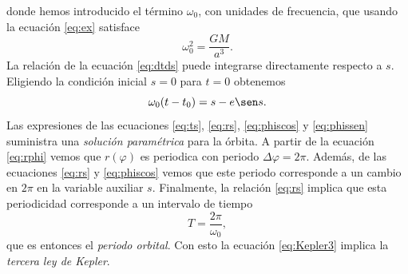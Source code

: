 donde hemos introducido el término $\omega_0$, con unidades de frecuencia, que usando la ecuación \ref{eq:ex} satisface 
\begin{equation}\label{eq:Kepler3}
    \omega_0^2=\frac{GM}{a^3}.    
\end{equation}
La relación de la ecuación \ref{eq:dtds} puede integrarse directamente respecto a $s$. Eligiendo la condición inicial $s=0$ para $t=0$ obtenemos
\begin{equation}\label{eq:ts}
    \omega_0(t-t_0)=s-e\sen s.
\end{equation}
Las expresiones de las ecuaciones \ref{eq:ts}, \ref{eq:rs}, \ref{eq:phiscos} y \ref{eq:phissen} suministra una \textit{solución paramétrica} para la órbita.
A partir de la ecuación \ref{eq:rphi} vemos que $r(\varphi)$ es periodica con periodo $\Delta\varphi=2\pi$. Además, de las ecuaciones \ref{eq:rs} y \ref{eq:phiscos} 
vemos que este periodo corresponde a un cambio en $2\pi$ en la variable auxiliar $s$. 
Finalmente, la relación \ref{eq:rs} implica que esta periodicidad corresponde a un intervalo de tiempo
\begin{equation}
T=\frac{2\pi}{\omega_0},
\end{equation}
que es entonces el \textit{periodo orbital}. Con esto la ecuación \ref{eq:Kepler3} implica la \textit{tercera ley de Kepler}.